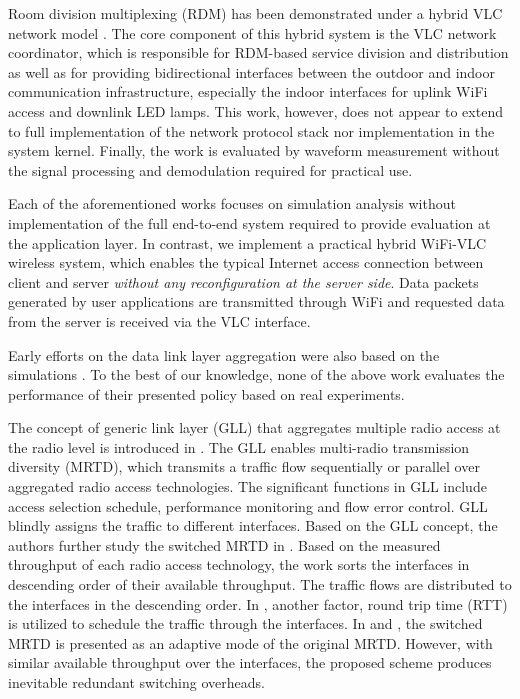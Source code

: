 \documentclass[10pt,journal]{IEEEtran}
\begin{document}
Room division multiplexing (RDM) has been demonstrated under a hybrid
VLC network model \cite{huang2013design}. The core component of this
hybrid system is the VLC network coordinator, which is responsible for
RDM-based service division and distribution as well as for providing
bidirectional interfaces between the outdoor and indoor communication
infrastructure, especially the indoor interfaces for uplink WiFi
access and downlink LED lamps. This work, however, does not appear to
extend to full implementation of the network protocol stack nor
implementation in the system kernel.  Finally, the work is evaluated
by waveform measurement without the signal processing and demodulation
required for practical use.

Each of the aforementioned works focuses on simulation analysis
without implementation of the full end-to-end system required to
provide evaluation at the application layer. In contrast, we implement a practical hybrid WiFi-VLC wireless
system, which enables the typical Internet access connection between client and
server {\em without any reconfiguration at the server side}. Data packets
generated by user applications are transmitted through WiFi and
requested data from the server is received via the VLC interface.

Early efforts on the data link layer aggregation were also based on the simulations \cite{koudouridis2005generic,koudouridis2005switched,yaver2009performance,kim2008mac,kim2010feedback,kim2012splitting}. To the best of our knowledge, none of the
above work evaluates the performance of their presented policy based on real experiments.

The concept of generic link layer (GLL) that aggregates multiple radio access at the radio level is introduced in \cite{koudouridis2005generic}. The GLL enables multi-radio transmission diversity (MRTD), which transmits a traffic flow sequentially or parallel over aggregated radio access technologies. The significant functions in GLL include access selection schedule, performance monitoring and flow error control. GLL blindly assigns the traffic to different interfaces. Based on the GLL concept, the authors further study the switched MRTD in \cite{koudouridis2005switched}. Based on the measured throughput of each radio access technology, the work sorts the interfaces in descending order of their available throughput. The traffic flows are distributed to the interfaces in the descending order.  In \cite{yaver2009performance}, another factor, round trip time (RTT) is utilized to schedule the traffic through the interfaces. In \cite{koudouridis2005switched} and \cite{yaver2009performance}, the switched MRTD is presented as an adaptive mode of the original MRTD. However, with similar available throughput over the interfaces, the proposed scheme produces inevitable redundant switching overheads.
\end{document}
